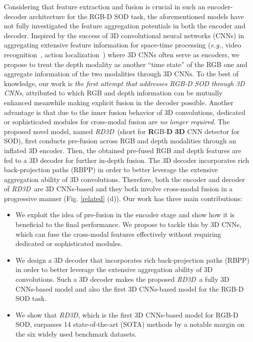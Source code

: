\documentclass[letterpaper]{article}
\def\eg{\emph{e.g.}}
\def\ourmodel{\emph{RD3D}}
\begin{document}
Considering that feature extraction and fusion is crucial in such an encoder-decoder architecture for the RGB-D SOD task, the aforementioned models have not fully investigated the feature aggregation potentials in both the encoder and decoder. Inspired by the success of 3D convolutional neural networks (CNNs) in aggregating extensive feature information for space-time processing (\eg, video recognition~\cite{feichtenhofer2020x3d}, action localization~\cite{gu2018ava}) where 3D CNNs often serve as encoders, we propose to treat the depth modality as another ``time state'' of the RGB one and aggregate information of the two modalities through 3D CNNs. To the best of knowledge, our work is \emph{the first attempt that addresses RGB-D SOD through 3D CNNs}, attributed to which RGB and depth information can be mutually enhanced meanwhile making explicit fusion in the decoder possible. Another advantage is that due to the inner fusion behavior of 3D convolutions, dedicated or sophisticated modules for cross-modal fusion are \emph{no longer required}.
The proposed novel model, named \ourmodel~(short for \textbf{R}GB-\textbf{D} \textbf{3D} CNN detector for SOD), first conducts pre-fusion across RGB and depth modalities through an inflated 3D encoder. Then, the obtained pre-fused RGB and depth features are fed to a 3D decoder for further in-depth fusion. The 3D decoder incorporates rich back-projection paths (RBPP) in order to better leverage the extensive aggregation ability of 3D convolutions. Therefore, both the encoder and decoder of \ourmodel~are 3D CNNs-based and they both involve cross-modal fusion in a progressive manner (Fig. \ref{related} (d)). Our work has three main contributions:
\begin{itemize}
\item We exploit the idea of pre-fusion in the encoder stage and show how it is beneficial to the final performance. We propose to tackle this by 3D CNNs, which can fuse the cross-modal features effectively without requiring dedicated or sophisticated modules.

\item We design a 3D decoder that incorporates rich back-projection paths (RBPP) in order to better leverage the extensive aggregation ability of 3D convolutions. Such a 3D decoder makes the proposed \ourmodel~a fully 3D CNNs-based model and also the first 3D CNNs-based model for the RGB-D SOD task.

\item We show that \ourmodel, which is the first 3D CNNs-based model for RGB-D SOD, surpasses 14 state-of-the-art (SOTA) methods by a notable margin on the six widely used benchmark datasets.
\end{itemize}
\end{document}
